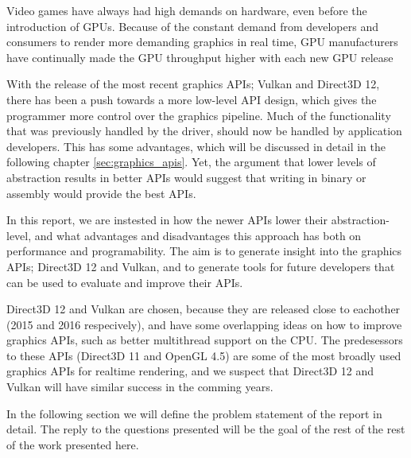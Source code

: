 Video games have always had high demands on hardware, even before the introduction of \glspl{GPU}.
Because of the constant demand from developers and consumers to render more demanding graphics in real time, \gls{GPU} manufacturers have continually made the \gls{GPU} throughput higher with each new \gls{GPU} release

With the release of the most recent graphics \glspl{API}; Vulkan and Direct3D 12, there has been a push towards a more low-level API design, which gives the programmer more control over the graphics pipeline.
Much of the functionality that was previously handled by the driver, should now be handled by application developers. 
This has some advantages, which will be discussed in detail in the following chapter \cref{sec:graphics_apis}.
Yet, the argument that lower levels of abstraction results in better \glspl{API} would suggest that writing in binary or assembly would provide the best \glspl{API}.

In this report, we are instested in how the newer \glspl{API} lower their abstraction-level, and what advantages and disadvantages this approach has both on performance and programability.
The aim is to generate insight into the graphics \glspl{API}; Direct3D 12 and Vulkan, and to generate tools for future developers that can be used to evaluate and improve their \glspl{API}.

Direct3D 12 and Vulkan are chosen, because they are released close to eachother (2015 and 2016 respecively), and have some overlapping ideas on how to improve graphics \glspl{API}, such as better multithread support on the CPU.
The predesessors to these \glspl{API} (Direct3D 11 and OpenGL 4.5) are some of the most broadly used graphics \glspl{API} for realtime rendering, and we suspect that Direct3D 12 and Vulkan will have similar success in the comming years.

In the following section we will define the problem statement of the report in detail.
The reply to the questions presented will be the goal of the rest of the rest of the work presented here.

